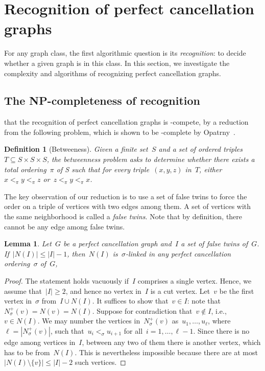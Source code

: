 \documentclass[a4paper,cleveref, autoref, 11pt, fleqn, thm-restate]{article}
\theoremstyle{plain}
\newtheorem{lemma}[theorem]{Lemma}
\newtheorem*{definition}{Definition}
\begin{document}
\section{Recognition of perfect cancellation graphs}


For any graph class, the first algorithmic question is its \emph{recognition}: to decide whether a given graph is in this class.
In this section, we investigate the complexity and algorithms of recognizing perfect cancellation graphs.

\subsection{The NP-completeness of recognition}

 that the recognition of perfect cancellation graphs is \NP-compete, by a reduction from the following problem, which is shown to be \NP-complete by Opatrny~\cite{opatrnyTotalOrderingProblem1979}.
\begin{definition}[Betweeness]
  Given a finite set~$S$ and a set of ordered triples~$T\subseteq S\times S\times S$, the betweenness problem asks to determine whether there exists a total ordering~$\pi$ of S such that for every triple~$(x,y,z)$ in~$T$, either~$x <_\pi y <_\pi z$ or~$z <_\pi y <_\pi x$.
\end{definition}

The key observation of our reduction is to use a set of false twins to force the order on a triple of vertices with two edges among them.  A set of vertices with the same neighborhood is called a \emph{false twins}.  Note that by definition, there cannot be any edge among false twins.

\begin{lemma}
  \label{lem:force-edge-orientation}
  Let~$G$ be a perfect cancellation graph and~$I$ a set of false twins of~$G$.  If~$|N(I)|\le |I| - 1$, then~$N(I)$ is~$\sigma$-linked in any perfect cancellation ordering~$\sigma$ of~$G$,
\end{lemma}
\begin{proof}
  The statement holds vacuously if~$I$ comprises a single vertex.  Hence, we assume that~$|I| \ge 2$, and hence no vertex in~$I$ is a cut vertex.
  Let~$v$ be the first vertex in~$\sigma$ from~$I\cup N(I)$.
  It suffices to show that~$v\in I$: note that~$N^{+}_{\sigma}(v) = N(v) = N(I)$.
  Suppose for contradiction that~$v\not\in I$, i.e., $v\in N(I)$.  We may number the vertices in~$N^{+}_{\sigma}(v)$ as~$u_{1}, \ldots, u_{\ell}$, where~$\ell = |N^{+}_{\sigma}(v)|$, such that~$u_{i} <_\sigma u_{i+1}$ for all~$i = 1, \ldots, \ell - 1$.
  Since there is no edge among vertices in~$I$, between any two of them there is another vertex, which has to be from~$N(I)$.
  This is nevertheless impossible because there are at most~$|N(I)\setminus \{v\}| \le |I| - 2$ such vertices.
\end{proof}
\end{document}
